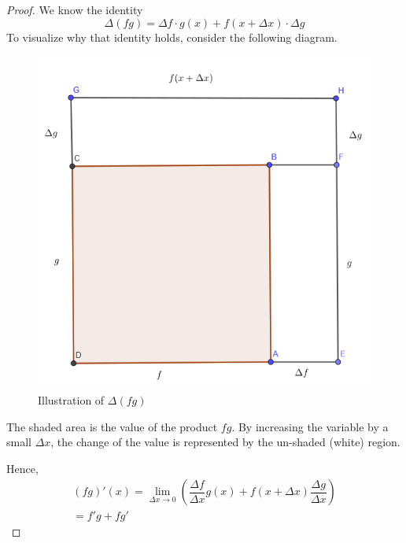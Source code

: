 \documentclass{article}
\theoremstyle{definition}
\theoremstyle{definition}
\theoremstyle{definition}
\theoremstyle{definition}
\theoremstyle{definition}
\theoremstyle{definition}
\theoremstyle{definition}
\theoremstyle{definition}
\theoremstyle{definition}
\begin{document}
\begin{proof}
We know the identity
\[\Delta(fg)=\Delta f\cdot g(x)+f(x+\Delta x)\cdot\Delta g\]
To visualize why that identity holds, consider the following diagram.
\begin{figure}[H]
    \centering
    \includegraphics[scale=0.8]{Pictures/product_rule_identity.PNG}
    \caption{Illustration of $\Delta(fg)$}
    \label{fig:my_label2}
\end{figure}
The shaded area is the value of the product $fg$. By increasing the variable by a small $\Delta x$, the change of the value is represented by the un-shaded (white) region.

Hence,
\begin{align*}
    (fg)'(x)=\lim_{\Delta x\to0}\left(\dfrac{\Delta f}{\Delta x}g(x)+f(x+\Delta x)\dfrac{\Delta g}{\Delta x}\right)\\
    =f'g+fg'
\end{align*}
\end{proof}
\end{document}
